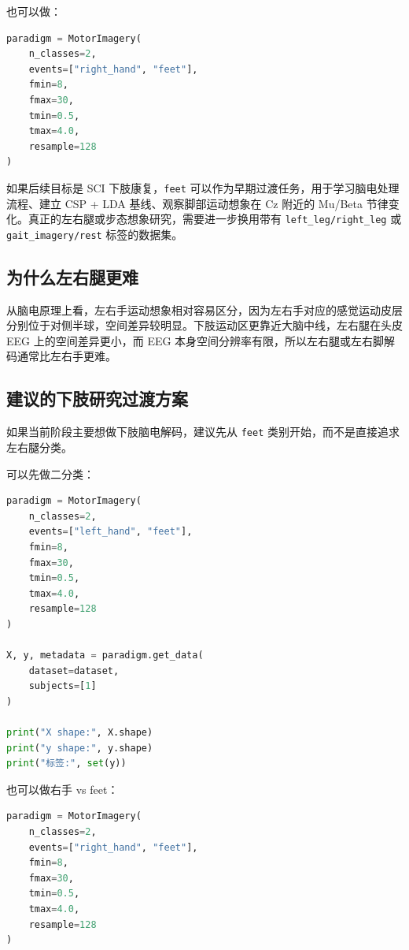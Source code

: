 \documentclass[UTF8,a4paper,12pt]{ctexart}
\begin{document}
也可以做：

\begin{lstlisting}[language=Python,caption={提取 \texttt{right\_hand} vs \texttt{feet} 数据}]
paradigm = MotorImagery(
    n_classes=2,
    events=["right_hand", "feet"],
    fmin=8,
    fmax=30,
    tmin=0.5,
    tmax=4.0,
    resample=128
)
\end{lstlisting}

如果后续目标是 SCI 下肢康复，\texttt{feet} 可以作为早期过渡任务，用于学习脑电处理流程、建立 CSP + LDA 基线、观察脚部运动想象在 Cz 附近的 Mu/Beta 节律变化。真正的左右腿或步态想象研究，需要进一步换用带有 \texttt{left\_leg/right\_leg} 或 \texttt{gait\_imagery/rest} 标签的数据集。

\subsection{为什么左右腿更难}

从脑电原理上看，左右手运动想象相对容易区分，因为左右手对应的感觉运动皮层分别位于对侧半球，空间差异较明显。下肢运动区更靠近大脑中线，左右腿在头皮 EEG 上的空间差异更小，而 EEG 本身空间分辨率有限，所以左右腿或左右脚解码通常比左右手更难。

\subsection{建议的下肢研究过渡方案}

如果当前阶段主要想做下肢脑电解码，建议先从 \texttt{feet} 类别开始，而不是直接追求左右腿分类。

可以先做二分类：

\begin{lstlisting}[language=Python,caption={左手 vs feet 下肢相关二分类}]
paradigm = MotorImagery(
    n_classes=2,
    events=["left_hand", "feet"],
    fmin=8,
    fmax=30,
    tmin=0.5,
    tmax=4.0,
    resample=128
)

X, y, metadata = paradigm.get_data(
    dataset=dataset,
    subjects=[1]
)

print("X shape:", X.shape)
print("y shape:", y.shape)
print("标签:", set(y))
\end{lstlisting}

也可以做右手 vs feet：

\begin{lstlisting}[language=Python,caption={右手 vs feet 下肢相关二分类}]
paradigm = MotorImagery(
    n_classes=2,
    events=["right_hand", "feet"],
    fmin=8,
    fmax=30,
    tmin=0.5,
    tmax=4.0,
    resample=128
)
\end{lstlisting}
\end{document}
